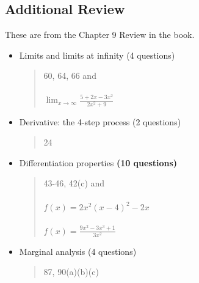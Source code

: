 \documentclass[14pt]{extarticle}
\begin{document}
\cleardoublepage

\subsection{Additional Review}
These are from the Chapter 9 Review in the book.
\begin{itemize}
	\item Limits and limits at infinity (4 questions)
	\begin{quote}
		60, 64, 66 and \\\\
		$\lim_{x \to \infty} \frac{5+2x-3x^2}{2x^2+9}$
	\end{quote}
	\item Derivative: the 4-step process (2 questions)
	\begin{quote}
		24
	\end{quote}
	\item Differentiation properties \textbf{(10 questions)}
		\begin{quote}
		43-46, 42(c) and \\\\
		$f(x) = 2x^2(x-4)^2 -2x$ \\\\
		$f(x) = \frac{9x^2 - 3x^3 +1}{3x^2}$
	\end{quote}
	\item Marginal analysis (4 questions)
	\begin{quote}
		87, 90(a)(b)(c)
	\end{quote}

\end{itemize}


\cleardoublepage
\end{document}
